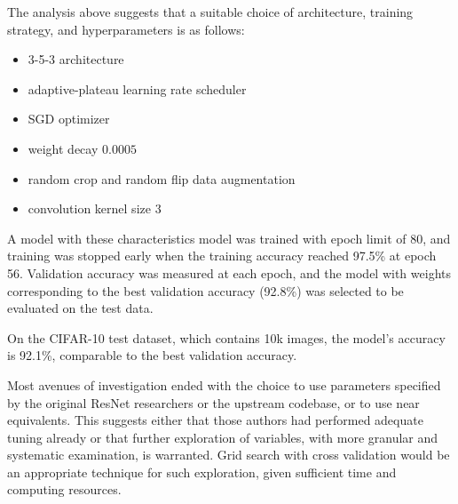 \documentclass[letterpaper]{article} %
\begin{document}
The analysis above suggests that a suitable choice of architecture, training strategy, and hyperparameters
is as follows:
\begin{itemize}
    \item 3-5-3 architecture
    \item adaptive-plateau learning rate scheduler
    \item SGD optimizer
    \item weight decay $ 0.0005 $
    \item random crop and random flip data augmentation
    \item convolution kernel size $ 3 $
\end{itemize}

A model with these characteristics model was trained with epoch limit of 80, and
training was stopped early when the training accuracy reached 97.5\% at epoch 56.
Validation accuracy was measured at each epoch, and the model with weights corresponding to the best
validation accuracy (92.8\%) was selected to be evaluated on the test data.

On the CIFAR-10 test dataset, which contains 10k images, the model's accuracy is 92.1\%,
comparable to the best validation accuracy.

Most avenues of investigation ended with the choice to use parameters specified by the original ResNet researchers or
the upstream codebase, or to use near equivalents.
This suggests either that those authors had performed adequate tuning already or that further exploration of variables,
with more granular and systematic examination, is warranted.
Grid search with cross validation would be an appropriate technique for such exploration, given sufficient time and
computing resources.



\end{document}
